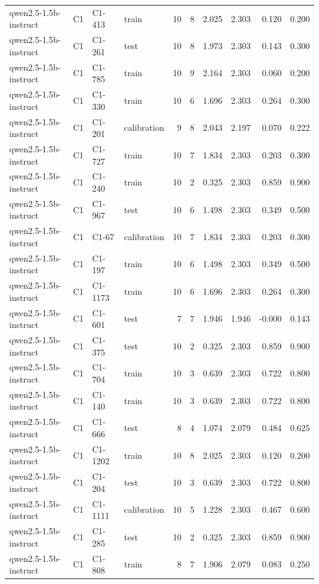\begin{table}
\begin{tabular}{llllrrrrrr}
qwen2.5-1.5b-instruct & C1 & C1-413 & train & 10 & 8 & 2.025 & 2.303 & 0.120 & 0.200 \\
qwen2.5-1.5b-instruct & C1 & C1-261 & test & 10 & 8 & 1.973 & 2.303 & 0.143 & 0.300 \\
qwen2.5-1.5b-instruct & C1 & C1-785 & train & 10 & 9 & 2.164 & 2.303 & 0.060 & 0.200 \\
qwen2.5-1.5b-instruct & C1 & C1-330 & train & 10 & 6 & 1.696 & 2.303 & 0.264 & 0.300 \\
qwen2.5-1.5b-instruct & C1 & C1-201 & calibration & 9 & 8 & 2.043 & 2.197 & 0.070 & 0.222 \\
qwen2.5-1.5b-instruct & C1 & C1-727 & train & 10 & 7 & 1.834 & 2.303 & 0.203 & 0.300 \\
qwen2.5-1.5b-instruct & C1 & C1-240 & train & 10 & 2 & 0.325 & 2.303 & 0.859 & 0.900 \\
qwen2.5-1.5b-instruct & C1 & C1-967 & test & 10 & 6 & 1.498 & 2.303 & 0.349 & 0.500 \\
qwen2.5-1.5b-instruct & C1 & C1-67 & calibration & 10 & 7 & 1.834 & 2.303 & 0.203 & 0.300 \\
qwen2.5-1.5b-instruct & C1 & C1-197 & train & 10 & 6 & 1.498 & 2.303 & 0.349 & 0.500 \\
qwen2.5-1.5b-instruct & C1 & C1-1173 & train & 10 & 6 & 1.696 & 2.303 & 0.264 & 0.300 \\
qwen2.5-1.5b-instruct & C1 & C1-601 & test & 7 & 7 & 1.946 & 1.946 & -0.000 & 0.143 \\
qwen2.5-1.5b-instruct & C1 & C1-375 & test & 10 & 2 & 0.325 & 2.303 & 0.859 & 0.900 \\
qwen2.5-1.5b-instruct & C1 & C1-704 & train & 10 & 3 & 0.639 & 2.303 & 0.722 & 0.800 \\
qwen2.5-1.5b-instruct & C1 & C1-140 & train & 10 & 3 & 0.639 & 2.303 & 0.722 & 0.800 \\
qwen2.5-1.5b-instruct & C1 & C1-666 & test & 8 & 4 & 1.074 & 2.079 & 0.484 & 0.625 \\
qwen2.5-1.5b-instruct & C1 & C1-1202 & train & 10 & 8 & 2.025 & 2.303 & 0.120 & 0.200 \\
qwen2.5-1.5b-instruct & C1 & C1-204 & test & 10 & 3 & 0.639 & 2.303 & 0.722 & 0.800 \\
qwen2.5-1.5b-instruct & C1 & C1-1111 & calibration & 10 & 5 & 1.228 & 2.303 & 0.467 & 0.600 \\
qwen2.5-1.5b-instruct & C1 & C1-285 & test & 10 & 2 & 0.325 & 2.303 & 0.859 & 0.900 \\
qwen2.5-1.5b-instruct & C1 & C1-808 & train & 8 & 7 & 1.906 & 2.079 & 0.083 & 0.250 \\

\end{tabular}
\end{table}

